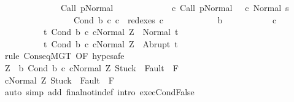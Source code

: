 \begin{isabellebody}
\ \ \ \ \ \ \ \ \ \ \ \ \ \ {\isasymGamma}{\isasymturnstile}Call\ p{\isasymdown}Normal\ {\isasymsigma}\ {\isasymand}\isanewline
\ \ \ \ \ \ \ \ \ \ \ {\isacharparenleft}{\isasymexists}c{\isacharprime}{\isachardot}\ {\isasymGamma}{\isasymturnstile}{\isacharparenleft}Call\ p{\isacharcomma}Normal\ {\isasymsigma}{\isacharparenright}\ {\isasymrightarrow}\isactrlsup {\isacharplus}\ {\isacharparenleft}c{\isacharprime}{\isacharcomma}\ Normal\ s{\isacharparenright}\ {\isasymand}\ \isanewline
\ \ \ \ \ \ \ \ \ \ \ \ \ \ \ \ \ Cond\ b\ c{}\ c{}\ {\isasymin}\ redexes\ c{\isacharprime}{\isacharparenright}{\isacharbraceright}\isanewline
\ \ \ \ \ \ \ \ \ \ \ {\isasyminter}\ {\isacharminus}b{\isacharparenright}\isanewline
\ \ \ \ \ \ \ \ \ \ \ c{}\ \isanewline
\ \ \ \ \ \ \ \ \ \ {\isacharbraceleft}t{\isachardot}\ {\isasymGamma}{\isasymturnstile}{\isasymlangle}Cond\ b\ c{}\ c{}{\isacharcomma}Normal\ Z{\isasymrangle}\ {\isasymRightarrow}\ Normal\ t{\isacharbraceright}{\isacharcomma}\isanewline
\ \ \ \ \ \ \ \ \ \ {\isacharbraceleft}t{\isachardot}\ {\isasymGamma}{\isasymturnstile}{\isasymlangle}Cond\ b\ c{}\ c{}{\isacharcomma}Normal\ Z{\isasymrangle}\ {\isasymRightarrow}\ Abrupt\ t{\isacharbraceright}{\isachardoublequoteclose}\isanewline
\ \ \isamarkupfalse%
\ {\isacharparenleft}rule\ ConseqMGT\ {\isacharbrackleft}OF\ hyp{\isacharunderscore}c{}{\isacharbrackright}{\isacharcomma}safe{\isacharparenright}\isanewline
\ \ \ \ \isamarkupfalse%
\ {\isachardoublequoteopen}Z\ {\isasymnotin}\ b{\isachardoublequoteclose}\ {\isachardoublequoteopen}{\isasymGamma}{\isasymturnstile}{\isasymlangle}Cond\ b\ c{}\ c{}{\isacharcomma}Normal\ Z{\isasymrangle}\ {\isasymRightarrow}{\isasymnotin}{\isacharparenleft}{\isacharbraceleft}Stuck{\isacharbraceright}\ {\isasymunion}\ Fault\ {\isacharbackquote}\ {\isacharparenleft}{\isacharminus}F{\isacharparenright}{\isacharparenright}{\isachardoublequoteclose}\isanewline
\ \ \ \ \isamarkupfalse%
\ {\isachardoublequoteopen}{\isasymGamma}{\isasymturnstile}{\isasymlangle}c{}{\isacharcomma}Normal\ Z{\isasymrangle}\ {\isasymRightarrow}{\isasymnotin}{\isacharparenleft}{\isacharbraceleft}Stuck{\isacharbraceright}\ {\isasymunion}\ Fault\ {\isacharbackquote}\ {\isacharparenleft}{\isacharminus}F{\isacharparenright}{\isacharparenright}{\isachardoublequoteclose}\isanewline
\ \ \ \ \ \ \isamarkupfalse%
\ {\isacharparenleft}auto\ simp\ add{\isacharcolon}\ final{\isacharunderscore}notin{\isacharunderscore}def\ intro{\isacharcolon}\ exec{\isachardot}CondFalse{\isacharparenright}\isanewline

\end{isabellebody}
